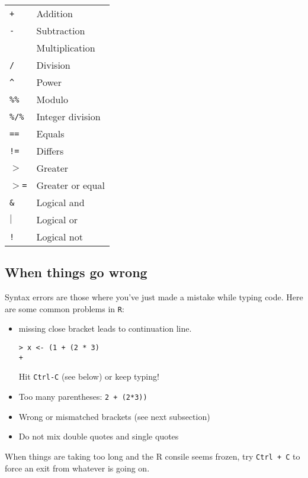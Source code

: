 \begin{tabular}{p{2cm} p{11cm}} 
 {\tt +} & Addition \\
 {\tt -} & Subtraction\\
 {\tt *} & Multiplication\\
 {\tt /} & Division\\
 {\tt \textasciicircum} & Power\\
 {\tt \%\%} & Modulo\\
 {\tt \%/\%} & Integer division\\
 {\tt ==} & Equals\\
 {\tt !=} & Differs\\
 {\tt $>$} & Greater\\
 {\tt $>$=} & Greater or equal\\
 {\tt \&} & Logical and\\
 {\tt $\vert$} & Logical or\\
 {\tt !} & Logical not\\
\end{tabular}

\subsection{When things go wrong}

Syntax errors are those where you've just made a mistake while typing 
code. Here are some common problems in {\tt R}: 

\begin{itemize}
\item missing close bracket leads to  continuation line.
\begin{lstlisting}
> x <- (1 + (2 * 3)
+ 
\end{lstlisting}
Hit {\tt Ctrl-C} (see below) or keep typing!

\item Too many parentheses: {\tt 2 + (2*3))}

\item Wrong or mismatched brackets (see next subsection)

\item Do not mix double quotes and single quotes

\end{itemize}

\begin{tipbox}
	When things are taking too long and the R consile seems frozen, try 
	{\tt Ctrl + C} to force an exit from whatever is going on.
\end{tipbox}


